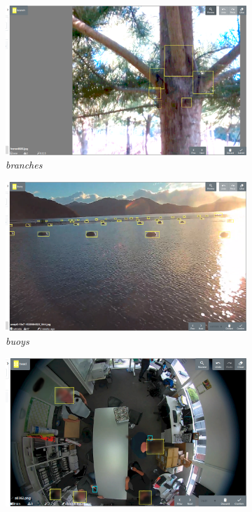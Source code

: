 \documentclass[conference]{IEEEtran}
\begin{document}
\begin{figure}[htb]
\centering
\begin{subfigure}[t]{0.2\linewidth}
  \includegraphics[width=0.9\linewidth]{figures/images/branches3.png}
   \caption{\emph{branches}}
\end{subfigure}%
\begin{subfigure}[t]{0.2\linewidth}
  \includegraphics[width=0.9\linewidth]{figures/images/buoys.png}
   \caption{\emph{buoys}}
 \end{subfigure}%
\begin{subfigure}[t]{0.2\linewidth}
  \includegraphics[width=0.9\linewidth]{figures/images/victor.png}

\end{subfigure}
\end{figure}
\end{document}
